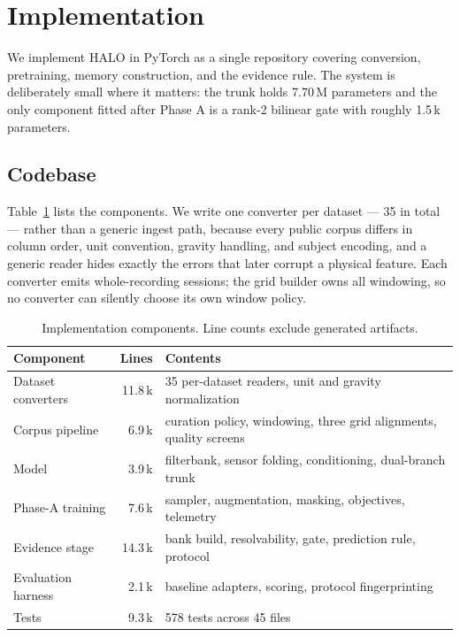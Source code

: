 \section{Implementation}
\label{sec:implementation}

We implement HALO in PyTorch as a single repository covering conversion, pretraining, memory
construction, and the evidence rule. The system is deliberately small where it matters: the trunk
holds 7.70\,M parameters and the only component fitted after Phase A is a rank-2 bilinear gate with
roughly 1.5\,k parameters.

\subsection{Codebase}
\label{sec:codebase}

Table~\ref{tab:implementation} lists the components. We write one converter per dataset --- 35 in
total --- rather than a generic ingest path, because every public corpus differs in column order,
unit convention, gravity handling, and subject encoding, and a generic reader hides exactly the
errors that later corrupt a physical feature. Each converter emits whole-recording sessions; the
grid builder owns all windowing, so no converter can silently choose its own window policy.

\begin{table}[t]
  \centering
  \caption{Implementation components. Line counts exclude generated artifacts.}
  \label{tab:implementation}
  \scriptsize
  \setlength{\tabcolsep}{3pt}
  \begin{tabular}{@{}lrp{}@{}}
    \toprule
    Component & Lines & Contents \\
    \midrule
    Dataset converters & 11.8\,k & 35 per-dataset readers, unit and gravity normalization \\
    Corpus pipeline    &  6.9\,k & curation policy, windowing, three grid alignments, quality screens \\
    Model              &  3.9\,k & filterbank, sensor folding, conditioning, dual-branch trunk \\
    Phase-A training   &  7.6\,k & sampler, augmentation, masking, objectives, telemetry \\
    Evidence stage     & 14.3\,k & bank build, resolvability, gate, prediction rule, protocol \\
    Evaluation harness &  2.1\,k & baseline adapters, scoring, protocol fingerprinting \\
    Tests              &  9.3\,k & 578 tests across 45 files \\
    \bottomrule
  \end{tabular}
\end{table}

